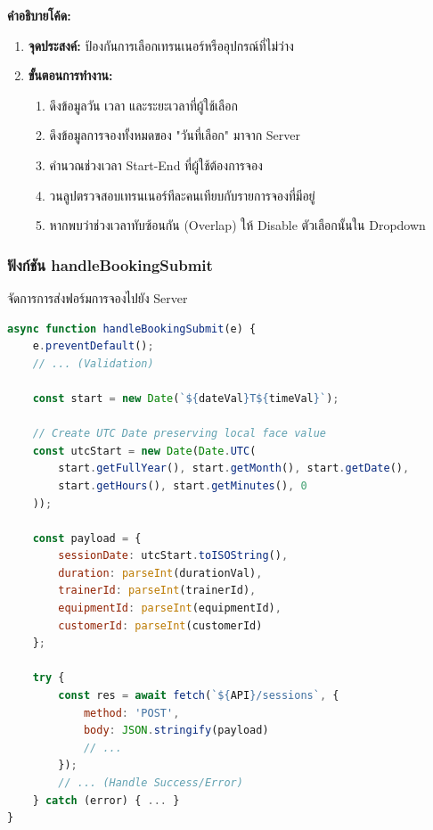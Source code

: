 \textbf{คำอธิบายโค้ด:}
\begin{enumerate}
    \item \textbf{จุดประสงค์:} ป้องกันการเลือกเทรนเนอร์หรืออุปกรณ์ที่ไม่ว่าง
    \item \textbf{ขั้นตอนการทำงาน:}
    \begin{enumerate}
        \item ดึงข้อมูลวัน เวลา และระยะเวลาที่ผู้ใช้เลือก
        \item ดึงข้อมูลการจองทั้งหมดของ "วันที่เลือก" มาจาก Server
        \item คำนวณช่วงเวลา Start-End ที่ผู้ใช้ต้องการจอง
        \item วนลูปตรวจสอบเทรนเนอร์ทีละคนเทียบกับรายการจองที่มีอยู่
        \item หากพบว่าช่วงเวลาทับซ้อนกัน (Overlap) ให้ Disable ตัวเลือกนั้นใน Dropdown
    \end{enumerate}
\end{enumerate}

\subsubsection{ฟังก์ชัน handleBookingSubmit}
จัดการการส่งฟอร์มการจองไปยัง Server

\begin{lstlisting}[language=JavaScript, caption={ซอร์สโค้ดจากไฟล์ frontend/js/user/dashboard.js: ฟังก์ชัน handleBookingSubmit}, label={code:user-dash-submit}]
async function handleBookingSubmit(e) {
    e.preventDefault();
    // ... (Validation)

    const start = new Date(`${dateVal}T${timeVal}`);
    
    // Create UTC Date preserving local face value
    const utcStart = new Date(Date.UTC(
        start.getFullYear(), start.getMonth(), start.getDate(),
        start.getHours(), start.getMinutes(), 0
    ));

    const payload = {
        sessionDate: utcStart.toISOString(),
        duration: parseInt(durationVal),
        trainerId: parseInt(trainerId),
        equipmentId: parseInt(equipmentId),
        customerId: parseInt(customerId)
    };

    try {
        const res = await fetch(`${API}/sessions`, {
            method: 'POST',
            body: JSON.stringify(payload)
            // ...
        });
        // ... (Handle Success/Error)
    } catch (error) { ... }
}
\end{lstlisting}

